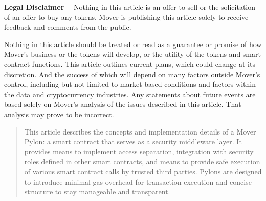 \documentclass[12pt]{article}
\begin{document}
\maketitle

\textbf{\footnotesize Legal Disclaimer}\scriptsize
~~Nothing in this article is an offer to sell or the solicitation of an offer to buy any tokens. Mover is publishing this article solely to receive feedback and comments from the public.

Nothing in this article should be treated or read as a guarantee or promise of how Mover’s business or the tokens will develop, or the utility of the tokens and smart contract functions. This article outlines current plans, which could change at its discretion. And the success of which will depend on many factors outside Mover’s control, including but not limited to market-based conditions and factors within the data and cryptocurrency industries. Any statements about future events are based solely on Mover’s analysis of the issues described in this article. That analysis may prove to be incorrect.

\begin{abstract}
This article describes the concepts and implementation details of a Mover Pylon: a smart contract that serves as a security middleware layer. It provides means to implement access separation, integration with security roles defined in other smart contracts, and means to provide safe execution of various smart contract calls by trusted third parties. Pylons are designed to introduce minimal gas overhead for transaction execution and concise structure to stay manageable and transparent.
\end{abstract}

\newpage

\end{document}
